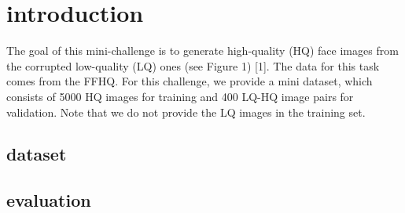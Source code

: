 \section{introduction}
\label{sec:introduction} %

The goal of this mini-challenge is to generate high-quality (HQ) face images from the
corrupted low-quality (LQ) ones (see Figure 1) [1]. The data for this task comes from
the FFHQ. For this challenge, we provide a mini dataset, which consists of 5000 HQ
images for training and 400 LQ-HQ image pairs for validation. Note that we do not
provide the LQ images in the training set.

\subsection{dataset}
\label{subsec:dataset} %

\subsection{evaluation}


